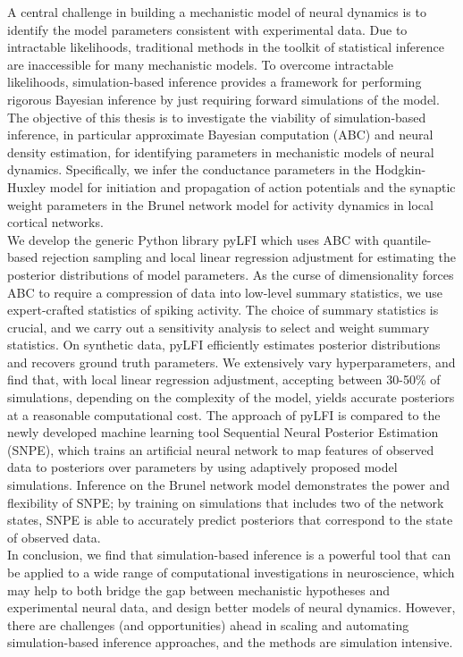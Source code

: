 A central challenge in building a mechanistic model of neural dynamics is to identify the model parameters consistent with experimental data. Due to intractable likelihoods, traditional methods in the toolkit of statistical inference are inaccessible for many mechanistic models. To overcome intractable likelihoods, simulation-based inference provides a framework for performing rigorous Bayesian inference by just requiring forward simulations of the model. The objective of this thesis is to investigate the viability of simulation-based inference, in particular approximate Bayesian computation (ABC) and neural density estimation, for identifying parameters in mechanistic models of neural dynamics. Specifically, we infer the conductance parameters in the Hodgkin-Huxley model for initiation and propagation of action potentials and the synaptic weight parameters in the Brunel network model for activity dynamics in local cortical networks. 
\\
\indent We develop the generic Python library pyLFI which uses ABC with quantile-based rejection sampling and local linear regression adjustment for estimating the posterior distributions of model parameters. As the curse of dimensionality forces ABC to require a compression of data into low-level summary statistics, we use expert-crafted statistics of spiking activity. The choice of summary statistics is crucial, and we carry out a sensitivity analysis to select and weight summary statistics. On synthetic data, pyLFI efficiently estimates posterior distributions and recovers ground truth parameters. We extensively vary hyperparameters, and find that, with local linear regression adjustment, accepting between 30-50\% of simulations, depending on the complexity of the model, yields accurate posteriors at a reasonable computational cost. The approach of pyLFI is compared to the newly developed machine learning tool Sequential Neural Posterior Estimation (SNPE), which trains an artificial neural network to map features of observed data to posteriors over parameters by using adaptively proposed model simulations. Inference on the Brunel network model demonstrates the power and flexibility of SNPE; by training on simulations that includes two of the network states, SNPE is able to accurately predict posteriors that correspond to the state of observed data.
\\
\indent In conclusion, we find that simulation-based inference is a powerful tool that can be applied to a wide range of computational investigations in neuroscience, which may help to both bridge the gap between mechanistic hypotheses and experimental neural data, and design better models of neural dynamics. However, there are challenges (and opportunities) ahead in scaling and automating simulation-based inference approaches, and the methods are simulation intensive. 
